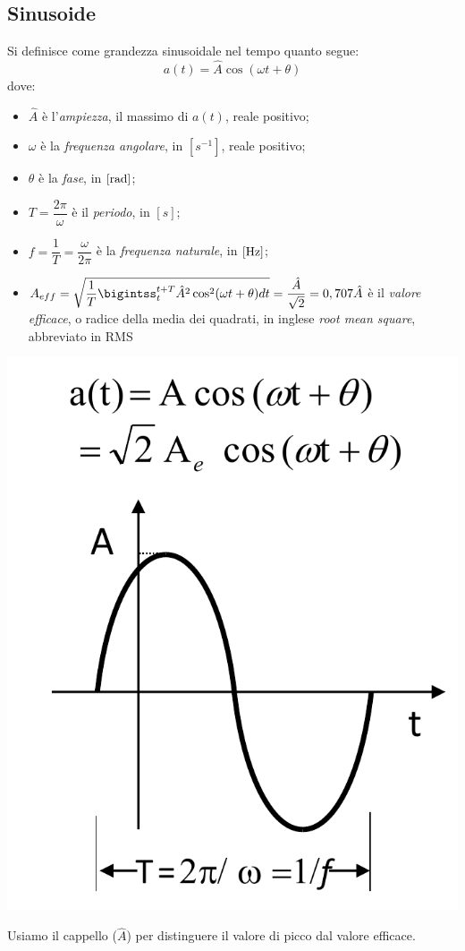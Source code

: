 \documentclass{article}
\begin{document}
\subsection{Sinusoide}
Si definisce come grandezza sinusoidale nel tempo quanto segue:
\[a(t)=\hat{A} \cos(\omega t+\theta)\]
dove:
\begin{itemize}
    \item $\hat A$ è l'\textit{ampiezza}, il massimo di $a(t)$, reale positivo;
    \item $\omega$ è la \textit{frequenza angolare}, in $[s^{-1}]$, reale positivo;
    \item $\theta$ è la \textit{fase}, in $[\text{rad}]$;
    \item $T = \dfrac{2\pi}{\omega}$ è il \textit{periodo}, in $[s]$;
    \item $f=\dfrac{1}{T} = \dfrac{\omega}{2\pi}$ è la \textit{frequenza naturale}, in $[\text{Hz}]$;
    \item $A_{eff} = \sqrt{\dfrac{1}{T}\bigintss_t^{t+T}\hat A^2\cos^2(\omega t + \theta)dt}=\dfrac{\hat A}{\sqrt{2}}=0,707 \hat A$ è il \textit{valore efficace}, o radice della media dei quadrati, in inglese \textit{root mean square}, abbreviato in RMS
\end{itemize}
\begin{center}
    \includegraphics[scale=0.3]{Image/Regime_sinusoidale_0.png}
\end{center}
Usiamo il cappello ($\hat A$) per distinguere il valore di picco dal valore efficace.
\end{document}
